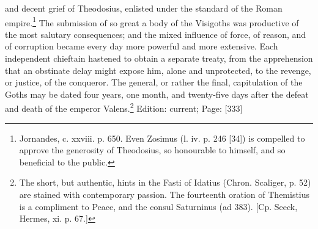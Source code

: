 and decent grief of Theodosius, enlisted under the standard of the Roman empire.\footnote{Jornandes, c. xxviii. p. 650. Even Zosimus (l. iv. p. 246 [34]) is compelled to approve the generosity of Theodosius, so honourable to himself, and so beneficial to the public.} The submission of so great a body of the Visigoths was productive of the most salutary consequences; and the mixed influence of force, of reason, and of corruption became every day more powerful and more extensive. Each independent chieftain hastened to obtain a separate treaty, from the apprehension that an obstinate delay might expose him, alone and unprotected, to the revenge, or justice, of the conqueror. The general, or rather the final, capitulation of the Goths may be dated four years, one month, and twenty-five days after the defeat and death of the emperor Valens.\footnote{The short, but authentic, hints in the Fasti of Idatius (Chron. Scaliger, p. 52) are stained with contemporary passion. The fourteenth oration of Themistius is a compliment to Peace, and the consul Saturninus (ad 383). [Cp. Seeck, Hermes, xi. p. 67.]}
Edition: current; Page: [333]

